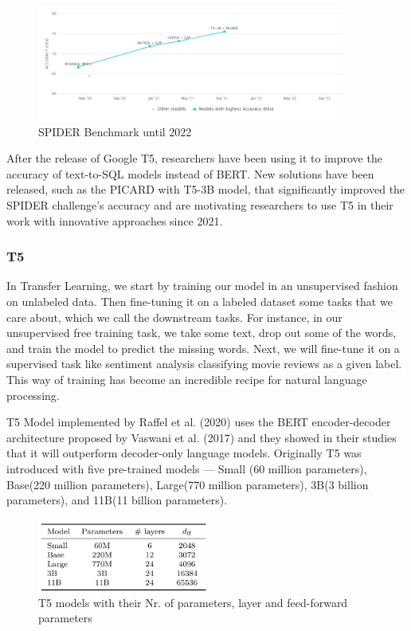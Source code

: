 \begin{figure}[h]
    \centering
    \includegraphics[width=0.9\textwidth]{pics/picard/spider.png}
    \caption{SPIDER Benchmark until 2022}
\end{figure}

After the release of Google T5, researchers have been using it to improve the accuracy of text-to-SQL models instead of BERT. New solutions have been released, such as the PICARD with T5-3B model, that significantly improved the SPIDER challenge's accuracy and are motivating researchers to use T5 in their work with innovative approaches since 2021.

\subsubsection{T5}

In Transfer Learning, we start by training our model in an unsupervised fashion on unlabeled data. Then fine-tuning it on a labeled dataset some tasks that we care about, which we call the downstream tasks. For instance, in our unsupervised free training task, we take some text, drop out some of the words, and train the model to predict the missing words. Next, we will fine-tune it on a supervised task like sentiment analysis classifying movie reviews as a given label. This way of training has become an incredible recipe for natural language processing.

T5 Model implemented by Raffel et al. (2020)\cite{raffel_exploring_2020} uses the BERT encoder-decoder architecture proposed by Vaswani et al. (2017) \cite{devlin-etal-2019-bert} and they showed in their studies that it will outperform decoder-only language models. Originally T5 was introduced with five pre-trained models — Small (60 million parameters), Base(220 million parameters), Large(770 million parameters), 3B(3 billion parameters), and 11B(11 billion parameters)\cite{raffel_exploring_2020}.

\begin{figure}[h]
    \centering
    \includegraphics[width=0.5\textwidth]{pics/picard/t5-size.png}
    \caption{T5 models with their Nr. of parameters, layer and feed-forward parameters\cite{raffel_exploring_2020}}
\end{figure}

